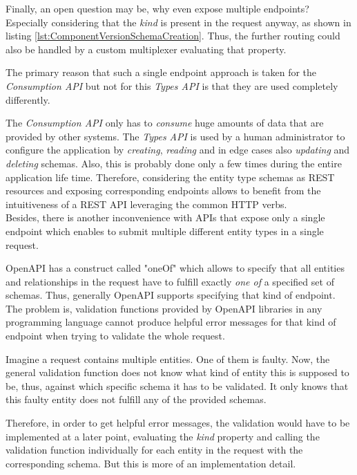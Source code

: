 Finally, an open question may be, why even expose multiple endpoints? Especially considering that the \emph{kind} is present in the request anyway, as shown in listing \ref{lst:ComponentVersionSchemaCreation}. Thus, the further routing could also be handled by a custom multiplexer evaluating that property.\par
The primary reason that such a single endpoint approach is taken for the \emph{Consumption API} but not for this \emph{Types API} is that they are used completely differently.\par
The \emph{Consumption API} only has to \emph{consume} huge amounts of data that are provided by other systems. The \emph{Types API} is used by a human administrator to configure the application by \emph{creating}, \emph{reading} and in edge cases also \emph{updating} and \emph{deleting} schemas. Also, this is probably done only a few times during the entire application life time. Therefore, considering the entity type schemas as REST resources and exposing corresponding endpoints allows to benefit from the intuitiveness of a REST API leveraging the common HTTP verbs.\\

Besides, there is another inconvenience with APIs that expose only a single endpoint which enables to submit multiple different entity types in a single request.\par 
OpenAPI has a construct called "oneOf" which allows to specify that all entities and relationships in the request have to fulfill exactly \emph{one of} a specified set of schemas. Thus, generally OpenAPI supports specifying that kind of endpoint. The problem is, validation functions provided by OpenAPI libraries in any programming language cannot produce helpful error messages for that kind of endpoint when trying to validate the whole request.\par 
Imagine a request contains multiple entities. One of them is faulty. Now, the general validation function does not know what kind of entity this is supposed to be, thus, against which specific schema it has to be validated. It only knows that this faulty entity does not fulfill any of the provided schemas.\par
Therefore, in order to get helpful error messages, the validation would have to be implemented at a later point, evaluating the \emph{kind} property and calling the validation function individually for each entity in the request with the corresponding schema. But this is more of an implementation detail.


